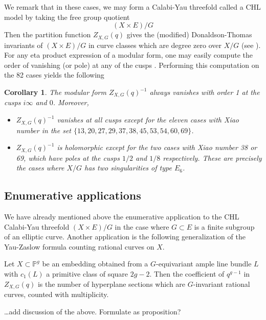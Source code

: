 \documentclass{article}
\newtheorem{corollary}[theorem]{Corollary}
\theoremstyle{definition}
\newcommand{\PP}{\mathbb{P}}
\begin{document}
We remark that in these cases, we may form a Calabi-Yau threefold
called a CHL model by taking the free group quotient
\[
(X\times E)/G
\]
Then the partition function $Z_{X,G}(q)$ gives the (modified)
Donaldson-Thomas invariants of $(X\times E)/G$ in curve classes which
are degree zero over $X/G$ (see \cite{bryan2018chl}).
For any eta product expression of a modular form, one may easily compute the
order of vanishing (or pole) at any of the cusps
\cite[Cor~2.2]{kohler2011eta}. Performing this computation on the 82
cases yields the following

\begin{corollary}\label{cor: vanishing at cusps}
The modular form $Z_{X,G}(q)^{-1}$ always vanishes with order 1 at the cusps
$i\infty$ and $0$. Moreover,
\begin{itemize}
\item $Z_{X,G}(q)^{-1}$ vanishes at all cusps except for the eleven
cases with Xiao number in the set $\{13,20,27,29,37,38,45,53,54,60,69 \}$.
\item $Z_{X,G}(q)^{-1}$ is holomorphic except for the two cases with
Xiao number 38 or 69, which have poles at the cusps $1/2$ and $1/8$
respectively. These are precisely the cases where $X/G$ has two
singularities of type $E_{6}$.
\end{itemize}
\end{corollary}


\subsection{Enumerative applications}\label{subsec: enumerative applications}

We have already mentioned above the enumerative application to the CHL
Calabi-Yau threefold $(X\times E)/G$ in the case where $G\subset E$ is
a finite subgroup of an elliptic curve. Another application is the
following generalization of the Yau-Zaslow formula counting rational
curves on $X$.

Let $X\subset \PP^{g}$ be an embedding obtained from a $G$-equivariant
ample line bundle $L$ with $c_{1}(L)$ a primitive class of square
$2g-2$. Then the coefficient of $q^{g-1}$ in $Z_{X,G}(q)$ is the
number of hyperplane sections which are $G$-invariant rational curves,
counted with multiplicity.

\dots add discussion of the above. Formulate as proposition?
\end{document}
